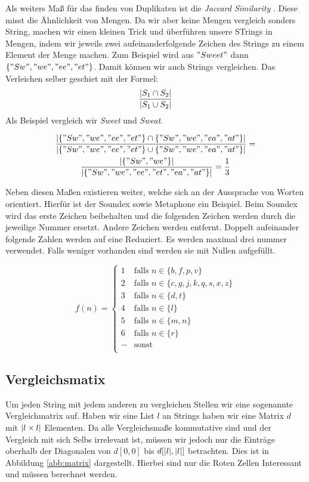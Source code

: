 \documentclass[sigconf]{acmart}
\DeclarePairedDelimiter\abs{\lvert}{\rvert}
\begin{document}
Als weiters Maß für das finden von Duplikaten ist die 
\emph{Jaccard Similarity} \cite[Vgl. 4.1.1]{theobald2008spotsigs}. Diese misst die Ähnlichkeit von Mengen.
Da wir aber keine Mengen vergleich sonders String, machen wir einen
kleinen Trick und überführen unsere STrings in Mengen, indem wir 
jeweils zwei aufeinanderfolgende Zeichen des Strings zu einem Element
der Menge machen. Zum Beispiel wird aus $"Sweet"$ dann 
$\{"Sw", "we", "ee", "et" \}$. Damit können wir auch Strings vergleichen.
Das Verleichen selber geschiet mit der Formel:
$$\frac{\abs{S_1 \cap S_2}}{\abs{S_1 \cup S_2}}$$
Als Beispiel vergleich wir \emph{Sweet} und \emph{Sweat}.

\begin{gather*}
  \frac{
    \abs{\{"Sw", "we", "ee", "et" \} \cap \{"Sw", "we", "ea", "at" \}}
  }{
    \abs{\{"Sw", "we", "ee", "et" \} \cup \{"Sw", "we", "ea", "at" \}}
  }
  = \\
  \frac{
    \abs{\{"Sw", "we"\}}
  }{
    \abs{\{"Sw", "we", "ee", "et", "ea", "at" \}}
  }
  = 
  \frac{1}{3}
\end{gather*}

Neben diesen Maßen existieren weiter, welche sich an der 
Aussprache von Worten orientiert. Hierfür ist der Soundex \cite[Vlg. S. 5]{elmagarmid1}
sowie Metaphone \cite[Vlg. S. 5]{elmagarmid1} ein Beispiel.
Beim Soundex wird das erste Zeichen beibehalten und die folgenden
Zeichen werden durch die jeweilige Nummer ersetzt. Andere Zeichen werden
entfernt. Doppelt aufeinander folgende Zahlen werden auf eine Reduziert.
Es werden maximal drei nummer verwendet. Falls weniger vorhanden sind 
werden sie mit Nullen aufgefüllt.


\[ f(n) =
  \begin{cases}
    1      & \text{falls } n \in \{b,f,p,v\}\\
    2      & \text{falls } n \in \{c,g,j,k,q,s,x,z\}\\
    3      & \text{falls } n \in \{d,t\}\\
    4      & \text{falls } n \in \{l\}\\
    5      & \text{falls } n \in \{m,n\}\\
    6      & \text{falls } n \in \{r\}\\
    -     & \text{sonst }\\
  \end{cases}
\]




\subsection*{Vergleichsmatix}
Um jeden String mit jedem anderen zu vergleichen Stellen wir eine 
sogenannte Vergleichmatrix auf. Haben wir eine List $l$ an Strings
haben wir eine Matrix $d$ mit $\abs{l\times l}$ Elementen. Da alle 
Vergleichsmaße kommutative sind und der Vergleich mit sich Selbs
irrelevant ist, müssen wir jedoch nur die Einträge oberhalb der 
Diagonalen von $d[0,0]$ bis $d[\abs{l}, \abs{l}]$ betrachten.
Dies ist in Abbildung \ref{abb:matrix} dargestellt. Hierbei 
sind nur die Roten Zellen Interessant und müssen berechnet werden.
\end{document}
